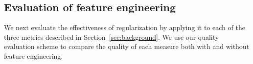 
\subsection{Evaluation of feature engineering}
\label{subsec:evaluation}
We next evaluate the effectiveness of regularization by applying it to each of the three metrics described in Section~\ref{sec:background}.
We use our quality evaluation scheme to compare the quality of each measure both with and without feature engineering.

